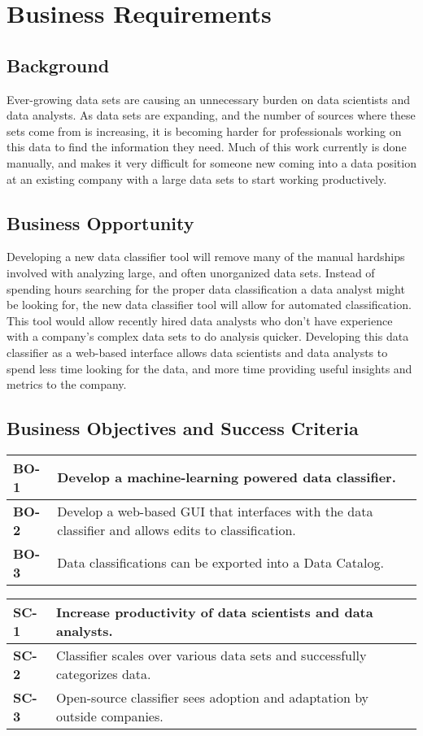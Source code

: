 \documentclass[12pt,oneside,letterpaper]{article}
\begin{document}
\newpage

\section{Business Requirements}
\subsection{Background}
Ever-growing data sets are causing an unnecessary burden on data scientists and data analysts. As data sets are expanding, and the number of sources where these sets come from is increasing, it is becoming harder for professionals working on this data to find the information they need. Much of this work currently is done manually, and makes it very difficult for someone new coming into a data position at an existing company with a large data sets to start working productively.
\subsection{Business Opportunity}
Developing a new data classifier tool will remove many of the manual hardships involved with analyzing large, and often unorganized data sets. Instead of spending hours searching for the proper data classification a data analyst might be looking for, the new data classifier tool will allow for automated classification. This tool would allow recently hired data analysts who don't have experience with a company's complex data sets to do analysis quicker. Developing this data classifier as a web-based interface allows data scientists and data analysts to spend less time looking for the data, and more time providing useful insights and metrics to the company.
\subsection{Business Objectives and Success Criteria}
\begin{tabular}{|p{1in}|p{4.5in}|}
\hline
\textbf{BO-1}&Develop a machine-learning powered data classifier.\\
\hline
\textbf{BO-2}&Develop a web-based GUI that interfaces with the data classifier and allows edits to classification.\\
\hline
\textbf{BO-3}&Data classifications can be exported into a Data Catalog.\\
\hline
\end{tabular}
\newline
\vspace{1cm}
\newline
\begin{tabular}{|p{1in}|p{4.5in}|}
\hline
\textbf{SC-1}&Increase productivity of data scientists and data analysts.\\
\hline
\textbf{SC-2}&Classifier scales over various data sets and successfully categorizes data.\\
\hline
\textbf{SC-3}&Open-source classifier sees adoption and adaptation by outside companies.\\
\hline
\end{tabular}
\end{document}
